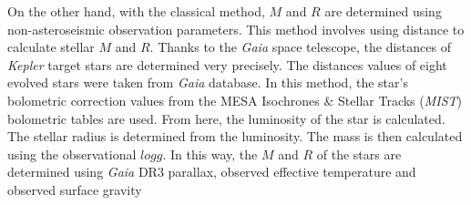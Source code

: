 \documentclass[a4paper,fleqn,usenatbib]{mnras}     %
\begin{document}
 
On the other hand, with the classical method, 
$M$ and $R$ are determined 
using non-asteroseismic observation parameters.
This method involves using 
distance to calculate stellar $M$ and $R$.
Thanks to the {\emph{Gaia}} space telescope, the distances of {\emph{Kepler}}
target stars are determined very precisely.
The distances values of eight evolved stars
 were taken from
 {\emph{Gaia}} database. 
In this method, 
the star's bolometric correction 
values from the
MESA Isochrones $\&$ Stellar Tracks
 ({\emph{MIST}}) bolometric tables are used. 
From here, the luminosity of the star is calculated. 
The stellar radius is determined from the luminosity. 
The mass is then calculated using the observational $log g$.
In this way, the $M$ and $R$ of the stars are determined
using {\emph{Gaia}} DR3 parallax, observed effective temperature and observed surface gravity
\end{document}
